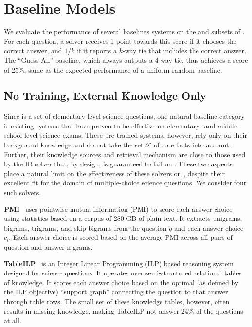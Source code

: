 \section{Baseline Models}
\label{sec:models}

We evaluate the performance of several baselines systems on the \devname and \testname subsets of \obqa.
For each question, a solver receives 1 point towards this score if it chooses the correct answer, and $1/k$ if it reports a $k$-way tie that includes the correct answer. The ``Guess All'' baseline, which always outputs a 4-way tie, thus achieves a score of 25\%, same as the expected performance of a uniform random baseline.

\subsection{No Training, External Knowledge Only}
\label{subsec:external-only}

Since \obqa is a set of elementary level science questions, one natural baseline category is existing systems that have proven to be effective on elementary- and middle-school level science exams. These pre-trained systems, however, rely only on their background knowledge and do not take the set $\mathcal{F}$ of core facts into account. Further, their knowledge sources and retrieval mechanism are close to those used by the IR solver that, by design, is guaranteed to fail on \obqa. These two aspects place a natural limit on the effectiveness of these solvers on \obqa, despite their excellent fit for the domain of multiple-choice science questions.  We consider four such solvers. 

\textbf{PMI}~\cite{clark2016combining} uses pointwise mutual information (PMI) to score each answer choice using statistics based on a corpus of 280 GB of plain text. It extracts unigrams, bigrams, trigrams, and skip-bigrams from the question $q$ and each answer choice $c_i$. Each answer choice is scored based on the average PMI across all pairs of question and answer n-grams.

\textbf{TableILP}~\cite{tableilp2016} is an Integer Linear Programming (ILP) based reasoning system designed for science questions. It operates over semi-structured relational tables of knowledge. It scores each answer choice based on the optimal (as defined by the ILP objective) ``support graph'' connecting the question to that answer through table rows. The small set of these knowledge tables, however, often results in missing knowledge, making TableILP not answer 24\% of the \obqa questions at all.

